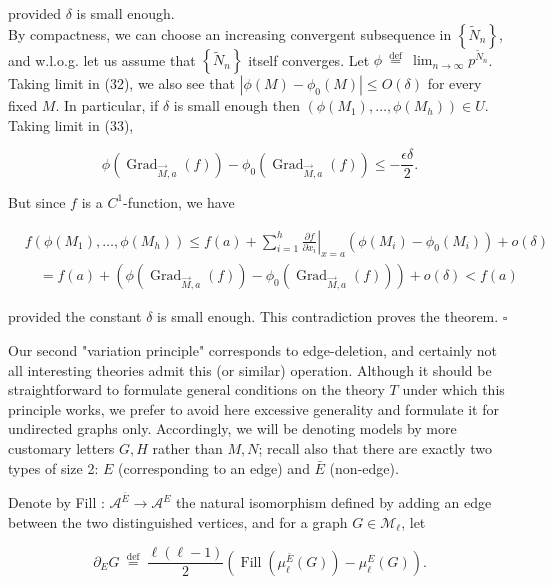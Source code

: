 \documentclass[10pt]{article}
\begin{document}
provided $\delta$ is small enough.\\
By compactness, we can choose an increasing convergent subsequence in $\left\{\widetilde{N}_{n}\right\}$, and w.l.o.g. let us assume that $\left\{\widetilde{N}_{n}\right\}$ itself converges. Let $\phi \stackrel{\text { def }}{=} \lim _{n \rightarrow \infty} p^{\widetilde{N}_{n}}$. Taking limit in (32), we also see that $\left|\phi(M)-\phi_{0}(M)\right| \leq O(\delta)$ for every fixed $M$. In particular, if $\delta$ is small enough then $\left(\phi\left(M_{1}\right), \ldots, \phi\left(M_{h}\right)\right) \in U$. Taking limit in (33),

$$
\phi\left(\operatorname{Grad}_{\vec{M}, a}(f)\right)-\phi_{0}\left(\operatorname{Grad}_{\vec{M}, a}(f)\right) \leq-\frac{\epsilon \delta}{2} .
$$

But since $f$ is a $C^{1}$-function, we have

$$
\begin{aligned}
& f\left(\phi\left(M_{1}\right), \ldots, \phi\left(M_{h}\right)\right) \leq f(a)+\left.\sum_{i=1}^{h} \frac{\partial f}{\partial x_{i}}\right|_{x=a}\left(\phi\left(M_{i}\right)-\phi_{0}\left(M_{i}\right)\right)+o(\delta) \\
& \quad=f(a)+\left(\phi\left(\operatorname{Grad}_{\vec{M}, a}(f)\right)-\phi_{0}\left(\operatorname{Grad}_{\vec{M}, a}(f)\right)\right)+o(\delta)<f(a)
\end{aligned}
$$

provided the constant $\delta$ is small enough. This contradiction proves the theorem. \(\square\)

Our second "variation principle" corresponds to edge-deletion, and certainly not all interesting theories admit this (or similar) operation. Although it should be straightforward to formulate general conditions on the theory $T$ under which this principle works, we prefer to avoid here excessive generality and formulate it for undirected graphs only. Accordingly, we will be denoting models by more customary letters $G, H$ rather than $M, N$; recall also that there are exactly two types of size 2: $E$ (corresponding to an edge) and $\bar{E}$ (non-edge).

Denote by Fill : $\mathcal{A}^{\bar{E}} \longrightarrow \mathcal{A}^{E}$ the natural isomorphism defined by adding an edge between the two distinguished vertices, and for a graph $G \in \mathcal{M}_{\ell}$, let

$$
\partial_{E} G \stackrel{\text { def }}{=} \frac{\ell(\ell-1)}{2}\left(\operatorname{Fill}\left(\mu_{\ell}^{\bar{E}}(G)\right)-\mu_{\ell}^{E}(G)\right) .
$$
\end{document}
